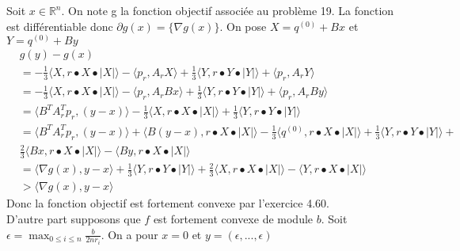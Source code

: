 \documentclass[12pt, letterpaper]{article}
\newcommand{\R}{\mathbb{R}^n}
\begin{document}
Soit $x\in\R$. On note g la fonction objectif associée au problème 19. La fonction est différentiable donc $\partial g(x) = \{\nabla g(x)\}$. On pose $X = q^{(0)} + Bx$ et $Y = q^{(0)} + By$
\begin{align*}
&g(y) - g(x) \\
&= -\frac{1}{3} \langle X,r \bullet X \bullet |X|\rangle  - \langle p_r,A_rX\rangle  + \frac{1}{3}\langle Y,r \bullet Y \bullet |Y|\rangle  + \langle p_r,A_rY\rangle   \\
&= -\frac{1}{3} \langle X,r \bullet X \bullet |X|\rangle  - \langle p_r,A_rBx\rangle  + \frac{1}{3}\langle Y,r \bullet Y \bullet |Y|\rangle  + \langle p_r,A_rBy\rangle   \\
&= \langle B^TA_r^Tp_r,(y - x)\rangle -\frac{1}{3} \langle X,r \bullet X \bullet |X|\rangle + \frac{1}{3}\langle Y,r \bullet Y \bullet |Y|\rangle \\
&= \langle B^TA_r^Tp_r,(y - x)\rangle + \langle B(y-x),r \bullet X \bullet |X|\rangle - \frac{1}{3}\langle q^{(0)},r \bullet X \bullet |X|\rangle + \frac{1}{3}\langle Y,r \bullet Y \bullet |Y|\rangle + \\
&\frac{2}{3} \langle Bx,r \bullet X \bullet |X|\rangle -  \langle By,r \bullet X \bullet |X|\rangle\\
&=  \langle \nabla g(x),y-x\rangle + \frac{1}{3}\langle Y,r \bullet Y \bullet |Y|\rangle + \frac{2}{3} \langle X,r \bullet X \bullet |X|\rangle -  \langle Y,r \bullet X \bullet |X|\rangle \\
&> \langle \nabla g(x),y-x\rangle \tag{Par le lemme du début}
\end{align*}
Donc la fonction objectif est fortement convexe par l'exercice 4.60. \\
D'autre part supposons que $f$ est fortement convexe de module $b$. Soit $\epsilon =  \max_{0\leq i \leq n} \frac{b}{2nr_i}$. On a pour $x = 0$ et $y = (\epsilon,...,\epsilon)$
\end{document}
